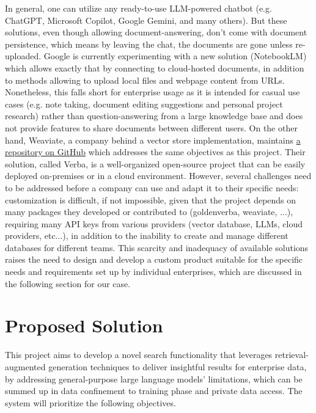 In general, one can utilize any ready-to-use LLM-powered chatbot (e.g. ChatGPT, Microsoft Copilot, Google Gemini, and many others). But these solutions, even though allowing document-answering, don't come with document persistence, which means by leaving the chat, the documents are gone unless re-uploaded.\smallskip\newline
Google is currently experimenting with a new solution (NotebookLM) which allows exactly that by connecting to cloud-hosted documents, in addition to methods allowing to upload local files and webpage content from URLs. Nonetheless, this falls short for enterprise usage as it is intended for casual use cases (e.g. note taking, document editing suggestions and personal project research) rather than question-answering from a large knowledge base and does not provide features to share documents between different users.\smallskip\newline
On the other hand, Weaviate, a company behind a vector store implementation, maintains \href{https://github.com/weaviate/Verba}{a repository on GitHub} which addresses the same objectives as this project. Their solution, called Verba, is a well-organized open-source project that can be easily deployed on-premises or in a cloud environment. However, several challenges need to be addressed before a company can use and adapt it to their specific needs: customization is difficult, if not impossible, given that the project depends on many packages they developed or contributed to (goldenverba, weaviate, ...), requiring many API keys from various providers (vector database, LLMs, cloud providers, etc...), in addition to the inability to create and manage different databases for different teams.\smallskip\newline
This scarcity and inadequacy of available solutions raises the need to design and develop a custom product suitable for the specific needs and requirements set up by individual enterprises, which are discussed in the following section for our case.

\section{Proposed Solution}
This project aims to develop a novel search functionality that leverages retrieval-augmented generation techniques to deliver insightful results for enterprise data, by addressing general-purpose large language models' limitations, which can be summed up in data confinement to training phase and private data access. The system will prioritize the following objectives.
